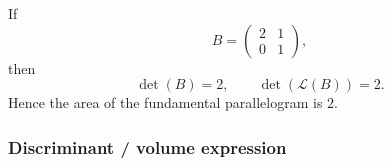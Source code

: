 \begin{example}
If
\[
B=
\begin{pmatrix}
	2 & 1\\
	0 & 1
\end{pmatrix},
\]
then
\[
\det(B)=2,
\qquad
\det(\mathcal L(B))=2.
\]
Hence the area of the fundamental parallelogram is \(2\).
\end{example}



\subsubsection{Discriminant / volume expression}
%
%
%
%
%
